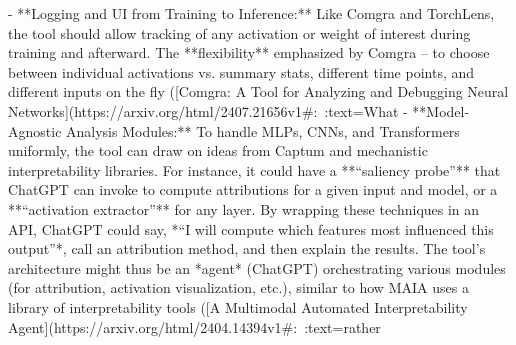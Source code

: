 - **Logging and UI from Training to Inference:** Like Comgra and TorchLens, the tool should allow tracking of any activation or weight of interest during training and afterward. The **flexibility** emphasized by Comgra – to choose between individual activations vs. summary stats, different time points, and different inputs on the fly ([Comgra: A Tool for Analyzing and Debugging Neural Networks](https://arxiv.org/html/2407.21656v1#:~:text=What%
- **Model-Agnostic Analysis Modules:** To handle MLPs, CNNs, and Transformers uniformly, the tool can draw on ideas from Captum and mechanistic interpretability libraries. For instance, it could have a **“saliency probe”** that ChatGPT can invoke to compute attributions for a given input and model, or a **“activation extractor”** for any layer. By wrapping these techniques in an API, ChatGPT could say, *“I will compute which features most influenced this output”*, call an attribution method, and then explain the results. The tool’s architecture might thus be an *agent* (ChatGPT) orchestrating various modules (for attribution, activation visualization, etc.), similar to how MAIA uses a library of interpretability tools ([A Multimodal Automated Interpretability Agent](https://arxiv.org/html/2404.14394v1#:~:text=rather%
